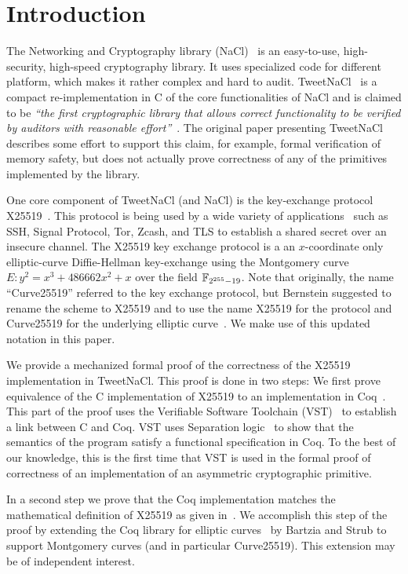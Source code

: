 \section{Introduction}
\label{sec:intro}

The Networking and Cryptography library (NaCl)~\cite{BLS12}
is an easy-to-use, high-security, high-speed cryptography library.
It uses specialized code for different platform, which makes it rather complex and hard to audit.
TweetNaCl~\cite{BGJ+15} is a compact re-implementation in C
of the core functionalities of NaCl and is claimed to be
\emph{``the first cryptographic library that allows correct functionality
to be verified by auditors with reasonable effort''}~\cite{BGJ+15}.
The original paper presenting TweetNaCl describes some effort to support
this claim, for example, formal verification of memory safety, but does not actually
prove correctness of any of the primitives implemented by the library.

One core component of TweetNaCl (and NaCl) is the key-exchange protocol X25519~\cite{rfc7748}.
This protocol is being used by a wide variety of applications~\cite{things-that-use-curve25519}
such as SSH, Signal Protocol, Tor, Zcash, and TLS to establish a shared secret over
an insecure channel.
The X25519 key exchange protocol is a an $x$-coordinate only
elliptic-curve Diffie-Hellman key-exchange using the Montgomery
curve $E: y^2 = x^3 + 486662 x^2 + x$ over the field $\mathbb{F}_{2^{255}-19}$.
Note that originally, the name ``Curve25519'' referred to the key exchange protocol,
but Bernstein suggested to rename the scheme to X25519 and to use the name
X25519 for the protocol and Curve25519 for the underlying elliptic curve~\cite{Ber14}.
We make use of this updated notation in this paper.

We provide a mechanized formal proof of the correctness of the X25519
implementation in TweetNaCl.
This proof is done in two steps:
We first prove equivalence of the C implementation of X25519
to an implementation in Coq~\cite{coq-faq}.
This part of the proof uses the Verifiable Software Toolchain (VST)~\cite{2012-Appel}
to establish a link between C and Coq.
VST uses Separation logic~\cite{1969-Hoare,Reynolds02separationlogic}
to show that the semantics of the program satisfy a functional specification in Coq.
To the best of our knowledge, this is the first time that
VST is used in the formal proof of correctness of an implementation
of an asymmetric cryptographic primitive.

In a second step we prove that the Coq implementation matches
the mathematical definition of X25519 as given in~\cite[Sec.~2]{Ber06}.
We accomplish this step of the proof by extending the Coq library
for elliptic curves~\cite{DBLP:conf/itp/BartziaS14} by Bartzia and Strub to
support Montgomery curves (and in particular Curve25519).
This extension may be of independent interest.

